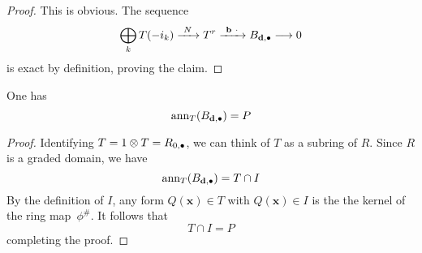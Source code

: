 \documentclass[fleqn,reqno]{amsart}
\begin{document}
\begin{proof}
This is obvious. The sequence
\begin{align}
	\label{eq:exact-seq-coker}
	\bigoplus_k T(-i_k)\xrightarrow{~N~}T^r\xrightarrow{~{\mathbf b}~\cdot~}B_{\mathbf d,\bullet}\longrightarrow 0
\end{align}
is exact by definition, proving the claim.
% 
%
%
%
\end{proof}

\begin{lemma}
\label{lemma:anncokerN}
One has
\[
	\operatorname{ann}_T (B_{\mathbf d,\bullet})=P
\]
\end{lemma}

\begin{proof}
Identifying $T=1\otimes T=R_{0,\bullet}$, we can think of $T$ as a subring of $R$.
Since $R$ is a graded domain, we have
\[
	\operatorname{ann}_T(B_{\mathbf d,\bullet})=T\cap I
\]
By the definition of $I$, any form $Q(\mathbf x)\in T$ with $Q(\mathbf x)\in I$ is the the kernel
of the ring map~$\phi^\#$. It follows that
\[
	T\cap I=P
\]
completing the proof.
\end{proof}
\end{document}
